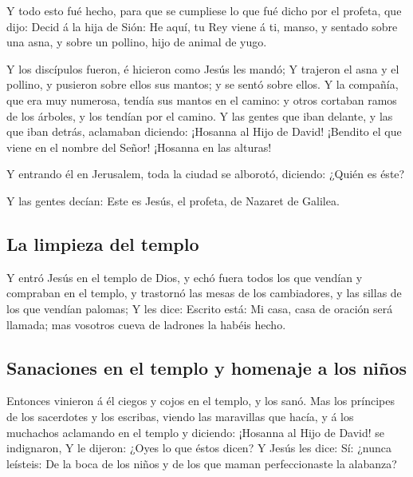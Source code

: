  Y todo esto fué hecho, para que se cumpliese lo que fué
dicho por el profeta, que dijo:  Decid á la hija de Sión:
He aquí, tu Rey viene á ti, manso, y sentado sobre una asna, y sobre un
pollino, hijo de animal de yugo.

 Y los discípulos fueron, é hicieron como Jesús les mandó;
 Y trajeron el asna y el pollino, y pusieron sobre ellos
sus mantos; y se sentó sobre ellos.  Y la compañía, que
era muy numerosa, tendía sus mantos en el camino: y otros cortaban ramos
de los árboles, y los tendían por el camino.  Y las gentes
que iban delante, y las que iban detrás, aclamaban diciendo: ¡Hosanna al
Hijo de David! ¡Bendito el que viene en el nombre del Señor! ¡Hosanna en
las alturas!

 Y entrando él en Jerusalem, toda la ciudad se alborotó,
diciendo: ¿Quién es éste?

 Y las gentes decían: Este es Jesús, el profeta, de
Nazaret de Galilea.

\hypertarget{la-limpieza-del-templo}{%
\subsection{La limpieza del templo}\label{la-limpieza-del-templo}}

 Y entró Jesús en el templo de Dios, y echó fuera todos
los que vendían y compraban en el templo, y trastornó las mesas de los
cambiadores, y las sillas de los que vendían palomas;  Y
les dice: Escrito está: Mi casa, casa de oración será llamada; mas
vosotros cueva de ladrones la habéis hecho.

\hypertarget{sanaciones-en-el-templo-y-homenaje-a-los-niuxf1os}{%
\subsection{Sanaciones en el templo y homenaje a los
niños}\label{sanaciones-en-el-templo-y-homenaje-a-los-niuxf1os}}

 Entonces vinieron á él ciegos y cojos en el templo, y
los sanó.  Mas los príncipes de los sacerdotes y los
escribas, viendo las maravillas que hacía, y á los muchachos aclamando
en el templo y diciendo: ¡Hosanna al Hijo de David! se indignaron,
 Y le dijeron: ¿Oyes lo que éstos dicen? Y Jesús les
dice: Sí: ¿nunca leísteis: De la boca de los niños y de los que maman
perfeccionaste la alabanza?

